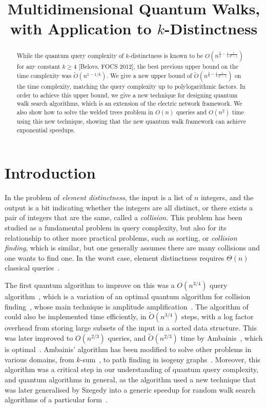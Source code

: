 \documentclass{theoretics}
\title{Multidimensional Quantum Walks, with Application to \texorpdfstring{$k$}{k}-Distinctness}
\renewcommand{\>}{\rangle}
\newcommand{\<}{\langle}
\renewcommand{\(}{\left(}
\renewcommand{\)}{\right)}
\begin{document}
\maketitle

\begin{abstract}
While the quantum query complexity of $k$-distinctness is known to be $O(n^{\frac{3}{4}-\frac{1}{4}\frac{1}{2^k-1}})$ for any constant $k\geq 4$ [Belovs, FOCS 2012], the best previous upper bound on the time complexity was $\widetilde{O}(n^{1-1/k})$. We give a new upper bound of $\widetilde{O}(n^{\frac{3}{4}-\frac{1}{4}\frac{1}{2^k-1}})$ on the time complexity, matching the query complexity up to polylogarithmic factors. In order to achieve this upper bound, we give a new technique for designing quantum walk search algorithms, which is an extension of the electric network framework. We also show how to solve the welded trees problem in $O(n)$ queries and $O(n^2)$ time using this new technique, showing that the new quantum walk framework can achieve exponential speedups.  
\end{abstract}

 

\section{Introduction}

In the problem of \emph{element distinctness}, the input is a list of $n$ integers, and the output is a bit indicating whether the integers are all distinct, or there exists a pair of integers that are the same, called a \emph{collision}. This problem has been studied as a fundamental problem in query complexity, but also for its relationship to other more practical problems, such as sorting, or \emph{collision finding}, which is similar, but one generally assumes there are many collisions and one wants to find one. In the worst case, element distinctness requires $\Theta(n)$ classical queries~\cite{ajtai2005EDlowerbound}. 

The first quantum algorithm to improve on this was a $O(n^{3/4})$ query algorithm~\cite{buhrman2001ElementDistinctness}, which is a variation of an optimal quantum algorithm for collision finding~\cite{brassard1997collision}, whose main technique is amplitude amplification~\cite{brassard2002AmpAndEst}. The algorithm of~\cite{buhrman2001ElementDistinctness} could also be implemented time efficiently, in $\widetilde{O}(n^{3/4})$ steps, with a log factor overhead from storing large subsets of the input in a sorted data structure. This was later improved to $O(n^{2/3})$ queries, and $\widetilde{O}(n^{2/3})$ time by Ambainis~\cite{ambainis2004QWalkForElementDist}, which is optimal~\cite{aaronson2004QLowerBndCollisionAndElementDistinct}. Ambainis' algorithm has been modified to solve other problems in various domains, from $k$-sum~\cite{childs2005quantum}, to path finding in isogeny graphs~\cite{tani2009claw,
costello2016isogeny}. Moreover, this algorithm was a critical step in our understanding of quantum query complexity, and quantum algorithms in general, as the algorithm used a new technique that was later generalised by Szegedy into a generic speedup for random walk search algorithms of a particular form~\cite{szegedy2004QMarkovChainSearch}. 
\end{document}
